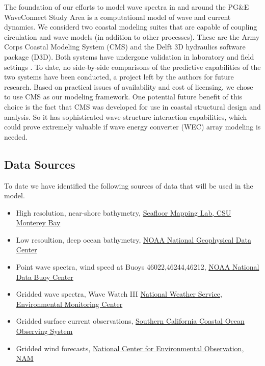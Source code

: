 \documentclass[11pt,letterpaper,oneside,reqno]{article}
\begin{document}
The foundation of our efforts to model wave spectra in and around
the PG\&E WaveConnect Study Area is a computational model of wave
and current dynamics. We considerd two coastal modeling suites that
are capable of coupling circulation and wave models (in addition to
other processes). These are the Army Corps Coastal Modeling System
(CMS) and the Delft 3D hydraulics software package (D3D). Both
systems have undergone validation in laboratory and field settings
\citep{lin2008}\citep{gerritsen2008}. To date, no side-by-side comparisons of
the predictive capabilities of the two systems have been conducted,
a project left by the authors for future research. Based on
practical issues of availability and cost of licensing, we chose to
use CMS as our modeling framework. One potential future benefit of
this choice is the fact that CMS was developed for use in coastal
structural design and analysis. So it has sophisticated
wave-structure interaction capabilities, which could prove
extremely valuable if wave energy converter (WEC) array modeling is
needed.

\subsection{Data Sources}

To date we have identified the following sources of data that will
be used in the model.

\begin{itemize}
\item
  High resolution, near-shore bathymetry,
  \href{http://seafloor.csumb.edu/SFMLwebDATA_SURVEYMAP.htm}{Seafloor Mapping Lab, CSU Monterey Bay}
\item
  Low resoultion, deep ocean bathymetry,
  \href{http://www.ngdc.noaa.gov/mgg/geodas/geodas.html}{NOAA National Geophysical Data Center}
\item
  Point wave spectra, wind speed at Buoys 46022,46244,46212,
  \href{http://www.ndbc.noaa.gov}{NOAA National Data Buoy Center}
\item
  Gridded wave spectra, Wave Watch III
  \href{http://polar.ncep.noaa.gov/waves/index2.shtml}{National Weather Service, Environmental Monitoring Center}
\item
  Gridded surface current observations,
  \href{http://www.sccoos.org/data/hfrnet/oi.php}{Southern California Coastal Ocean Observing System}
\item
  Gridded wind forecasts,
  \href{http://www.nco.ncep.noaa.gov/pmb/nwprod/analysis/}{National Center for Environmental Observation, NAM}
\end{itemize}
\end{document}
